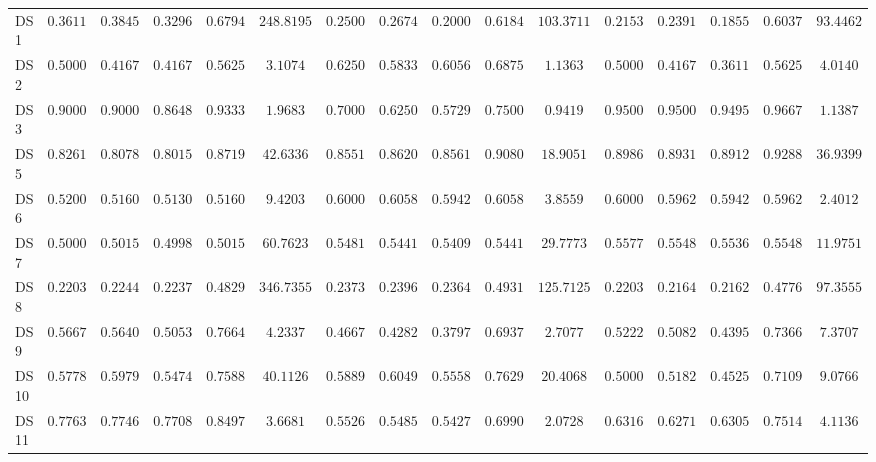 {\begin{longtable}{|l|ccccc|ccccc|ccccc|}
		DS 1 & $\boldsymbol{0.3611}$ & $\boldsymbol{0.3845}$ & $\boldsymbol{0.3296}$ & $\boldsymbol{0.6794}$ & $248.8195$ & $0.2500$ & $0.2674$ & $0.2000$ & $0.6184$ & $103.3711$ & $0.2153$ & $0.2391$ & $0.1855$ & $0.6037$ & $93.4462$ \\
		DS 2 & $0.5000$ & $0.4167$ & $0.4167$ & $0.5625$ & $3.1074$ & $\boldsymbol{0.6250}$ & $\boldsymbol{0.5833}$ & $\boldsymbol{0.6056}$ & $\boldsymbol{0.6875}$ & $1.1363$ & $0.5000$ & $0.4167$ & $0.3611$ & $0.5625$ & $4.0140$ \\
		DS 3 & $0.9000$ & $0.9000$ & $0.8648$ & $0.9333$ & $1.9683$ & $0.7000$ & $0.6250$ & $0.5729$ & $0.7500$ & $0.9419$ & $\boldsymbol{0.9500}$ & $\boldsymbol{0.9500}$ & $\boldsymbol{0.9495}$ & $\boldsymbol{0.9667}$ & $1.1387$ \\
		DS 5 & $0.8261$ & $0.8078$ & $0.8015$ & $0.8719$ & $42.6336$ & $0.8551$ & $0.8620$ & $0.8561$ & $0.9080$ & $18.9051$ & $\boldsymbol{0.8986}$ & $\boldsymbol{0.8931}$ & $\boldsymbol{0.8912}$ & $\boldsymbol{0.9288}$ & $36.9399$ \\
		DS 6 & $0.5200$ & $0.5160$ & $0.5130$ & $0.5160$ & $9.4203$ & $0.6000$ & $\boldsymbol{0.6058}$ & $\boldsymbol{0.5942}$ & $\boldsymbol{0.6058}$ & $3.8559$ & $0.6000$ & $0.5962$ & $0.5942$ & $0.5962$ & $2.4012$ \\
		DS 7 & $0.5000$ & $0.5015$ & $0.4998$ & $0.5015$ & $60.7623$ & $0.5481$ & $0.5441$ & $0.5409$ & $0.5441$ & $29.7773$ & $\boldsymbol{0.5577}$ & $\boldsymbol{0.5548}$ & $\boldsymbol{0.5536}$ & $\boldsymbol{0.5548}$ & $11.9751$ \\
		DS 8 & $0.2203$ & $0.2244$ & $0.2237$ & $0.4829$ & $346.7355$ & $\boldsymbol{0.2373}$ & $\boldsymbol{0.2396}$ & $\boldsymbol{0.2364}$ & $\boldsymbol{0.4931}$ & $125.7125$ & $0.2203$ & $0.2164$ & $0.2162$ & $0.4776$ & $97.3555$ \\
		DS 9 & $\boldsymbol{0.5667}$ & $\boldsymbol{0.5640}$ & $\boldsymbol{0.5053}$ & $\boldsymbol{0.7664}$ & $4.2337$ & $0.4667$ & $0.4282$ & $0.3797$ & $0.6937$ & $2.7077$ & $0.5222$ & $0.5082$ & $0.4395$ & $0.7366$ & $7.3707$ \\
		DS 10 & $0.5778$ & $0.5979$ & $0.5474$ & $0.7588$ & $40.1126$ & $\boldsymbol{0.5889}$ & $\boldsymbol{0.6049}$ & $\boldsymbol{0.5558}$ & $\boldsymbol{0.7629}$ & $20.4068$ & $0.5000$ & $0.5182$ & $0.4525$ & $0.7109$ & $9.0766$ \\
		DS 11 & $\boldsymbol{0.7763}$ & $\boldsymbol{0.7746}$ & $\boldsymbol{0.7708}$ & $\boldsymbol{0.8497}$ & $3.6681$ & $0.5526$ & $0.5485$ & $0.5427$ & $0.6990$ & $2.0728$ & $0.6316$ & $0.6271$ & $0.6305$ & $0.7514$ & $4.1136$ \\

\end{longtable}}
